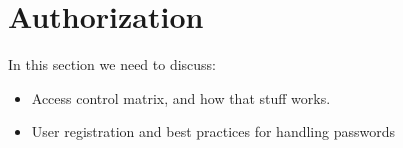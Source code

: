 
\section{Authorization}

In this section we need to discuss:

\begin{itemize}
\item Access control matrix, and how that stuff works.
\item User registration and best practices for handling passwords
\end{itemize}

